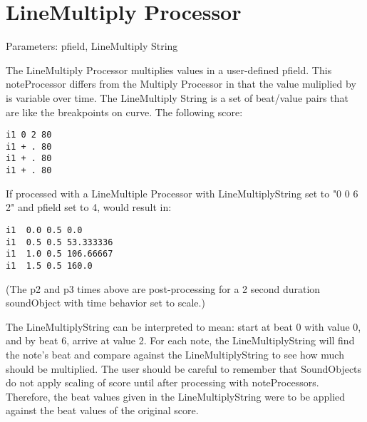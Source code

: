 \section{LineMultiply Processor}\label{lineMultiplyProcessor}

Parameters: pfield, LineMultiply String

The LineMultiply Processor multiplies values in a user-defined pfield.
This noteProcessor differs from the Multiply Processor in that the value
muliplied by is variable over time. The LineMultiply String is a set of
beat/value pairs that are like the breakpoints on curve. The following
score:

\begin{verbatim}
i1 0 2 80
i1 + . 80
i1 + . 80
i1 + . 80
\end{verbatim}

If processed with a LineMultiple Processor with LineMultiplyString set
to "0 0 6 2" and pfield set to 4, would result in:

\begin{verbatim}
i1  0.0 0.5 0.0
i1  0.5 0.5 53.333336
i1  1.0 0.5 106.66667
i1  1.5 0.5 160.0
\end{verbatim}

(The p2 and p3 times above are post-processing for a 2 second duration
soundObject with time behavior set to scale.)

The LineMultiplyString can be interpreted to mean: start at beat 0 with
value 0, and by beat 6, arrive at value 2. For each note, the
LineMultiplyString will find the note's beat and compare against the
LineMultiplyString to see how much should be multiplied. The user should
be careful to remember that SoundObjects do not apply scaling of score
until after processing with noteProcessors. Therefore, the beat values
given in the LineMultiplyString were to be applied against the beat
values of the original score.

